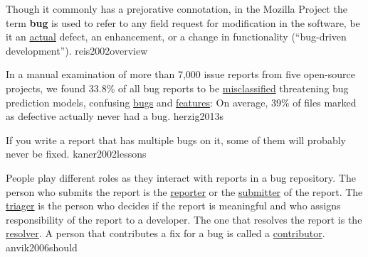 \documentclass{article}
\begin{document}
  {Though it commonly has a prejorative connotation, in the Mozilla Project the term \textbf{bug} is used to refer to any field request for modification in the software, be it an \ul{actual} defect, an enhancement, or a change in functionality (``bug-driven development'').}
  {reis2002overview}

  {In a manual examination of more than 7,000 issue reports from five open-source projects, we found 33.8\% of all bug reports to be \ul{misclassified} threatening bug prediction models, confusing \ul{bugs} and \ul{features}: On average, 39\% of files marked as defective actually never had a bug.}
  {herzig2013s}



  {If you write a report that has multiple bugs on it, some of them will probably never be fixed.}
  {kaner2002lessons}

  {People play different roles as they interact with reports in a bug repository. The person who submits the report is the \ul{reporter} or the \ul{submitter} of the report. The \ul{triager} is the person who decides if the report is meaningful and who assigns responsibility of the report to a developer. The one that resolves the report is the \ul{resolver}. A person that contributes a fix for a bug is called a \ul{contributor}.}
  {anvik2006should}


\end{document}
